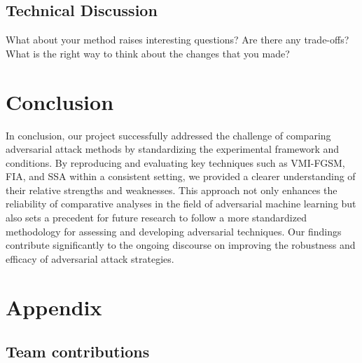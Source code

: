 

\subsection{Technical Discussion}

What about your method raises interesting questions? Are there any trade-offs? What is the right way to think about the changes that you made?

\section{Conclusion}
In conclusion, our project successfully addressed the challenge of comparing adversarial attack methods by standardizing the experimental framework and conditions. By reproducing and evaluating key techniques such as VMI-FGSM, FIA, and SSA within a consistent setting, we provided a clearer understanding of their relative strengths and weaknesses. This approach not only enhances the reliability of comparative analyses in the field of adversarial machine learning but also sets a precedent for future research to follow a more standardized methodology for assessing and developing adversarial techniques. Our findings contribute significantly to the ongoing discourse on improving the robustness and efficacy of adversarial attack strategies.

{\small


}

\newpage
\section*{Appendix}

\subsection*{Team contributions}

